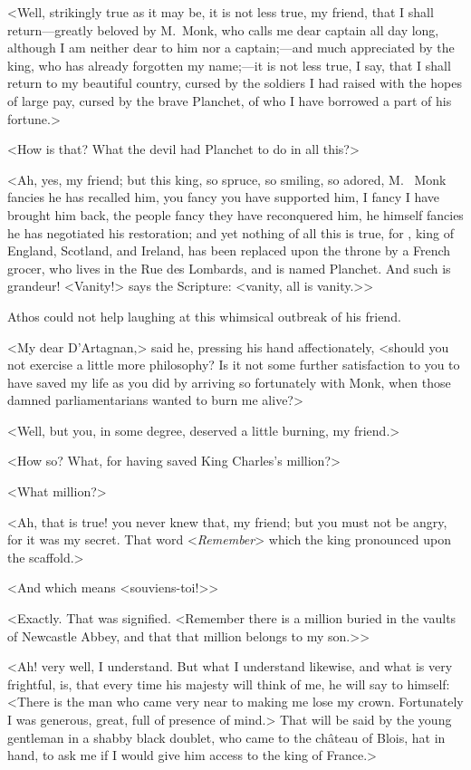 <Well, strikingly true as it may be, it is not less true, my friend, that I shall return—greatly beloved by M.~Monk, who calls me dear captain all day long, although I am neither dear to him nor a captain;—and much appreciated by the king, who has already forgotten my name;—it is not less true, I say, that I shall return to my beautiful country, cursed by the soldiers I had raised with the hopes of large pay, cursed by the brave Planchet, of who I have borrowed a part of his fortune.>

<How is that? What the devil had Planchet to do in all this?>

<Ah, yes, my friend; but this king, so spruce, so smiling, so adored, M.~ Monk fancies he has recalled him, you fancy you have supported him, I fancy I have brought him back, the people fancy they have reconquered him, he himself fancies he has negotiated his restoration; and yet nothing of all this is true, for , king of England, Scotland, and Ireland, has been replaced upon the throne by a French grocer, who lives in the Rue des Lombards, and is named Planchet. And such is grandeur! <Vanity!> says the Scripture: <vanity, all is vanity.>>

Athos could not help laughing at this whimsical outbreak of his friend.

<My dear D'Artagnan,> said he, pressing his hand affectionately, <should you not exercise a little more philosophy? Is it not some further satisfaction to you to have saved my life as you did by arriving so fortunately with Monk, when those damned parliamentarians wanted to burn me alive?>

<Well, but you, in some degree, deserved a little burning, my friend.>

<How so? What, for having saved King Charles's million?>

<What million?>

<Ah, that is true! you never knew that, my friend; but you must not be angry, for it was my secret. That word <\textit{Remember}> which the king pronounced upon the scaffold.>

<And which means <souviens-toi!>>

<Exactly. That was signified. <Remember there is a million buried in the vaults of Newcastle Abbey, and that that million belongs to my son.>>

<Ah! very well, I understand. But what I understand likewise, and what is very frightful, is, that every time his majesty  will think of me, he will say to himself: <There is the man who came very near to making me lose my crown. Fortunately I was generous, great, full of presence of mind.> That will be said by the young gentleman in a shabby black doublet, who came to the château of Blois, hat in hand, to ask me if I would give him access to the king of France.>

